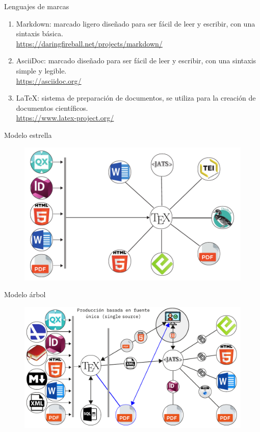 \documentclass[14pt,aspectratio=169]{beamer}
\begin{document}
\begin{frame}{Lenguajes de marcas}
	\begin{enumerate}
		\item Markdown: marcado ligero diseñado para ser fácil de leer y escribir, con una sintaxis básica.\\
		\url{https://daringfireball.net/projects/markdown/}
		\item AsciiDoc: marcado diseñado para ser fácil de leer y escribir, con una sintaxis simple y legible.\\
		\url{https://asciidoc.org/}
		\item LaTeX: sistema de preparación de documentos, se utiliza para la creación de documentos científicos.\\
		\url{https://www.latex-project.org/}
	\end{enumerate}
\end{frame}

\begin{frame}{Modelo estrella}
	\begin{figure}
		\centering
		\includegraphics[width=.7\textwidth]{estrella.pdf}
	\end{figure}
\end{frame}

\begin{frame}{Modelo árbol}
	\begin{figure}
		\centering
		\includegraphics[width=.8\textwidth]{arbol2.pdf}
	\end{figure}
\end{frame}
\end{document}

